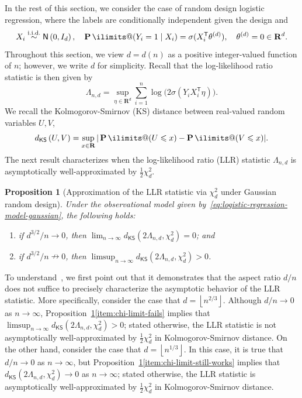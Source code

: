 \documentclass[11pt, letterpaper, hidelinks]{article}
\makeatletter
\newcommand{\R}{\mathbf R}
\newcommand{\floor}[1]{\left\lfloor #1 \right\rfloor}
\newcommand{\1}{\mathbf 1}
\renewcommand{\leq}{\leqslant}
\newcommand{\T}{\mathsf{T}}
\newcommand{\iid}{\textnormal{i.i.d.}}
\newcommand{\simiid}{\stackrel{\iid}{\sim}}
\renewcommand{\P}{\operatorname*{\mathbf{P}}\ilimits@}
\theoremstyle{plain}
\newtheorem{proposition}{Proposition}[section]
\theoremstyle{definition}
\newcommand{\Normal}[2]{\mathsf{N}\left(#1, #2\right)}
\newcommand{\KSDist}[2]{d_{\mathsf{KS}}\left(#1, #2\right)}
\makeatother
\begin{document}
In the rest of this section, we consider the case of random design logistic regression, where the labels are conditionally independent given the design and
\begin{equation}
\label{eq:logistic-regression-model-gaussian}
X_i \simiid \Normal{0}{I_d}, \quad
\P(Y_i=1\mid X_i)=\sigma(X_i^\T \theta^{(d)}),
\quad \theta^{(d)} = 0 \in \R^d.
\end{equation}
Throughout this section, we view $d = d(n)$ as a positive integer-valued
function of $n$; however, we write $d$ for simplicity. 
Recall that the log-likelihood ratio statistic is then given by 
\[
\Lambda_{n,d} = \sup_{\eta \in \R^d} \sum_{i=1}^n \log\big(2 \sigma(Y_i X_i^\T \eta)\big).
\]
We recall the Kolmogorov-Smirnov (KS) distance between real-valued random variables $U, V$,
\[
\KSDist{U}{V} = \sup_{x \in \R} | \P(U \leq x) - \P(V \leq x) |.
\]
The next result characterizes when the log-likelihood ratio (LLR) statistic $\Lambda_{n, d}$ 
is asymptotically well-approximated by $\tfrac{1}{2} \chi^2_d$. 
\begin{proposition}[Approximation of the LLR statistic via $\chi^2_d$ under Gaussian random design]
\label{prop:chi-limit-behavior}
Under the observational model given by~\cref{eq:logistic-regression-model-gaussian}, the following holds: 
\begin{enumerate}[label=(\roman*)]
\item \label{item:chi-limit-still-works}
if $d^{3/2}/n \to 0$, then $\lim_{n \to \infty}\KSDist{2\Lambda_{n,d}}{\chi^2_d} =0$; and 
\item \label{item:chi-limit-fails}
if $d^{3/2}/n \nrightarrow 0$, then $\limsup_{n \to \infty}\KSDist{2\Lambda_{n,d}}{\chi^2_d} > 0$.
\end{enumerate} 
\end{proposition}

To understand~,
we first point out that it demonstrates that the 
aspect ratio $d/n$ does not suffice to precisely 
characterize the asymptotic behavior of the LLR statistic. 
More specifically, consider the case that $d = \floor{n^{2/3}}$. 
Although $d/n \to 0$ as $n \to \infty$, Proposition~\ref{prop:chi-limit-behavior}\ref{item:chi-limit-fails} implies that $\limsup_{n\to\infty}\KSDist{2\Lambda_{n,d}}{\chi^2_d} > 0$; stated otherwise, the LLR statistic is not asymptotically well-approximated by $\tfrac{1}{2}\chi^2_d$ in Kolmogorov-Smirnov distance.
On the other hand, consider the case that $d = \floor{n^{1/3}}$. 
In this case, it is true that $d/n \to 0$ as $n \to \infty$, but
Proposition~\ref{prop:chi-limit-behavior}\ref{item:chi-limit-still-works} implies that
$\KSDist{2\Lambda_{n,d}}{\chi^2_d} \to 0$ as $n \to \infty$; 
stated otherwise, the LLR statistic is asymptotically well-approximated by $\tfrac{1}{2}\chi^2_d$ in Kolmogorov-Smirnov distance.
\end{document}
